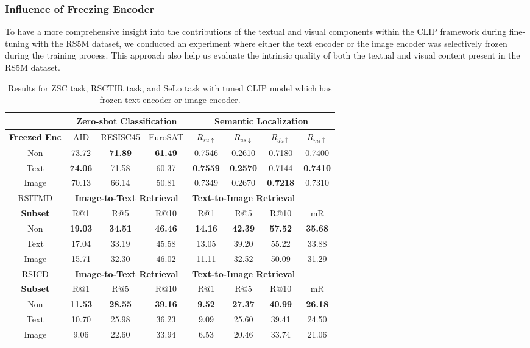 \documentclass[journal]{IEEEtran}
\begin{document}
\subsubsection{Influence of Freezing Encoder}

To have a more comprehensive insight into the contributions of the textual and visual components within the CLIP framework during fine-tuning with the RS5M dataset, we conducted an experiment where either the text encoder or the image encoder was selectively frozen during the training process. This approach also help us evaluate the intrinsic quality of both the textual and visual content present in the RS5M dataset.

\begin{table}[ht]
\caption{Results for ZSC task, RSCTIR task, and SeLo task with tuned CLIP model which has frozen text encoder or image encoder.}
\label{table:freeze_encoder}
\footnotesize
\setlength{\tabcolsep}{1.0pt}
\begin{tabular}{cccccccc}
\toprule
& \multicolumn{3}{c}{\textbf{Zero-shot Classification}} & \multicolumn{4}{c}{\textbf{Semantic Localization}} \\
\midrule
\textbf{Freezed Enc} & AID & RESISC45 & EuroSAT & $R_{su\uparrow}$ & $R_{as\downarrow}$ & $R_{da\uparrow}$ & $R_{mi\uparrow}$ \\
\midrule
 Non & 73.72 & \textbf{71.89} & \textbf{61.49} & 0.7546 & 0.2610 &0.7180 &0.7400 \\
 Text & \textbf{74.06} & 71.58 & 60.37 & \textbf{0.7559} & \textbf{0.2570} &0.7144 & \textbf{0.7410}	 \\
 Image & 70.13 & 66.14 &50.81 &0.7349	&0.2670	&\textbf{0.7218}	&0.7310	  \\
\midrule
\midrule
RSITMD & \multicolumn{3}{c}{\textbf{Image-to-Text Retrieval}} & \multicolumn{3}{c}{\textbf{Text-to-Image Retrieval}} & \\
\midrule
\textbf{Subset} &  {R@1} & {R@5} & {R@10} & {R@1} & {R@5} & {R@10} & {mR} \\
 \midrule
 Non & \textbf{19.03} & 	\textbf{34.51} & 	\textbf{46.46}	 & \textbf{14.16}	&  \textbf{42.39} & 	\textbf{57.52}  & 	\textbf{35.68}\\
 Text &17.04	&33.19	&45.58	&13.05	&39.20	&55.22	&33.88\\
 Image  &15.71	&32.30	&46.02	&11.11	&32.52	&50.09	&31.29	\\
\midrule
RSICD & \multicolumn{3}{c}{\textbf{Image-to-Text Retrieval}} & \multicolumn{3}{c}{\textbf{Text-to-Image Retrieval}} & \\
\midrule
\textbf{Subset} &  {R@1} & {R@5} & {R@10} & {R@1} & {R@5} & {R@10} & {mR} \\
 \midrule
 Non & \textbf{11.53}  &	\textbf{28.55} 	& \textbf{39.16}  & 	\textbf{9.52}  & 	\textbf{27.37} 	& \textbf{40.99}  &	\textbf{26.18} \\
 Text &10.70	&25.98	&36.23	&9.09	&25.60	&39.41	&24.50\\
 Image  &9.06	&22.60	&33.94	&6.53	&20.46	&33.74	&21.06 \\
\bottomrule
\end{tabular}
\end{table}
\end{document}
